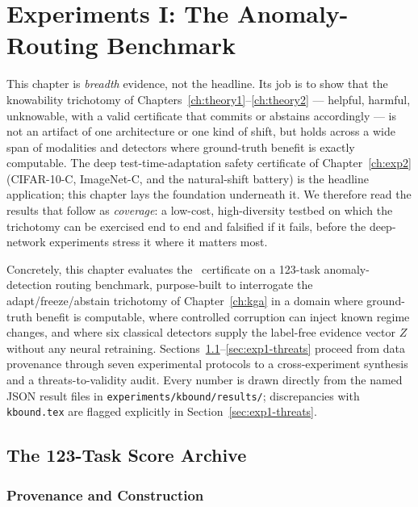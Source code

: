 \chapter{Experiments I: The Anomaly-Routing Benchmark}\label{ch:exp1}

This chapter is \emph{breadth} evidence, not the headline. Its job is to show that the
knowability trichotomy of Chapters~\ref{ch:theory1}--\ref{ch:theory2} --- helpful,
harmful, unknowable, with a valid certificate that commits or abstains accordingly ---
is not an artifact of one architecture or one kind of shift, but holds across a wide
span of modalities and detectors where ground-truth benefit is exactly computable. The
deep test-time-adaptation safety certificate of Chapter~\ref{ch:exp2} (CIFAR-10-C,
ImageNet-C, and the natural-shift battery) is the headline application; this chapter
lays the foundation underneath it. We therefore read the results that follow as
\emph{coverage}: a low-cost, high-diversity testbed on which the trichotomy can be
exercised end to end and falsified if it fails, before the deep-network experiments
stress it where it matters most.

Concretely, this chapter evaluates the \KGA\ certificate on a 123-task
anomaly-detection routing benchmark, purpose-built to interrogate the
adapt/freeze/abstain trichotomy of Chapter~\ref{ch:kga} in a domain where ground-truth
benefit is computable, where controlled corruption can inject known regime changes, and
where six classical detectors supply the label-free evidence vector $Z$ without any
neural retraining.  Sections~\ref{sec:exp1-archive}--\ref{sec:exp1-threats} proceed from
data provenance through seven experimental protocols to a cross-experiment synthesis and
a threats-to-validity audit.  Every number is drawn directly from the named JSON result
files in \texttt{experiments/kbound/results/}; discrepancies with \texttt{kbound.tex}
are flagged explicitly in Section~\ref{sec:exp1-threats}.

\section{The 123-Task Score Archive}
\label{sec:exp1-archive}

\subsection{Provenance and Construction}

